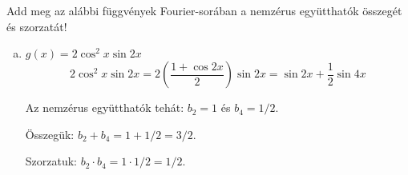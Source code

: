 \begin{exercise}{%
    Add meg az alábbi függvények Fourier-sorában a nemzérus együtthatók összegét
    és szorzatát!
  }
{\begin{enumerate}[a)]
            Az nemzérus együtthatók tehát: $a_2 = 3$ és $a_6 = 1$.

            Összegük: $a_2 + a_6 = 3 + 1 = 4$.

            Szorzatuk: $a_2 \cdot a_6 = 3 \cdot 1 = 3$.

      \item $g(x) = 2 \cos^2 x \sin 2x$
            \[
              2 \cos^2 x \sin 2x
              = 2 \left( \frac{1 + \cos 2x}{2} \right) \sin 2x
              = \sin 2x + \frac{1}{2} \sin 4x
            \]

            Az nemzérus együtthatók tehát: $b_2 = 1$ és $b_4 = 1/2$.

            Összegük: $b_2 + b_4 = 1 + 1/2 = 3/2$.

            Szorzatuk: $b_2 \cdot b_4 = 1 \cdot 1/2 = 1/2$.
    \end{enumerate}
  }
\end{exercise}
